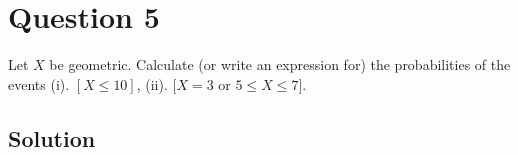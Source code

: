 \section*{Question 5}

Let \( X \) be geometric.
Calculate (or write an expression for) the probabilities of the events
(i). \( [X \leq 10] \),
(ii). \( [X=3 \) or \( 5 \leq X \leq 7] \).

\subsection*{Solution}
